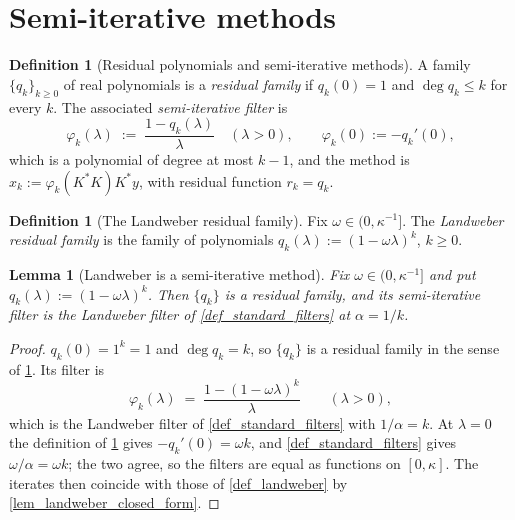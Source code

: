 \documentclass[a4paper]{report}
\theoremstyle{plain}
\newtheorem{lemma}[theorem]{Lemma}
\theoremstyle{definition}
\newtheorem{definition}[theorem]{Definition}
\theoremstyle{remark}
\begin{document}
\section{Semi-iterative methods}

\begin{definition}[Residual polynomials and semi-iterative methods]
  \label{def_residual_polynomial}
  A family $\{q_k\}_{k \ge 0}$ of real polynomials is a \emph{residual family} if
  $q_k(0) = 1$ and $\deg q_k \le k$ for every $k$.  The associated \emph{semi-iterative
  filter} is
  \[
    \varphi_{k}(\lambda) \;:=\; \frac{1-q_k(\lambda)}{\lambda} \quad (\lambda > 0),
    \qquad \varphi_k(0) := -q_k'(0) ,
  \]
  which is a polynomial of degree at most $k-1$, and the method is
  $x_k := \varphi_k(K^{*}K)K^{*}y$, with residual function $r_k = q_k$.
\end{definition}


\begin{definition}[The Landweber residual family]
  \label{def_landweber_residual_poly}
  Fix $\omega \in (0,\kappa^{-1}]$.  The \emph{Landweber residual family} is the family
  of polynomials $q_k(\lambda) := (1-\omega\lambda)^{k}$, $k \ge 0$.
\end{definition}


\begin{lemma}[Landweber is a semi-iterative method]
  \label{lem_landweber_residual_polynomial}
  Fix $\omega \in (0,\kappa^{-1}]$ and put $q_k(\lambda) := (1-\omega\lambda)^{k}$.  Then
  $\{q_k\}$ is a residual family, and its semi-iterative filter is the Landweber filter of
  \cref{def_standard_filters} at $\alpha = 1/k$.
\end{lemma}
\begin{proof}
  $q_k(0) = 1^{k} = 1$ and $\deg q_k = k$, so $\{q_k\}$ is a residual family in the sense
  of \cref{def_residual_polynomial}.  Its filter is
  \[
    \varphi_k(\lambda) \;=\; \frac{1-(1-\omega\lambda)^{k}}{\lambda}
      \qquad (\lambda > 0) ,
  \]
  which is the Landweber filter of \cref{def_standard_filters} with $1/\alpha = k$.  At
  $\lambda = 0$ the definition of \cref{def_residual_polynomial} gives
  $-q_k'(0) = \omega k$, and \cref{def_standard_filters} gives $\omega/\alpha = \omega k$;
  the two agree, so the filters are equal as functions on $[0,\kappa]$.  The iterates then
  coincide with those of \cref{def_landweber} by \cref{lem_landweber_closed_form}.
\end{proof}
\end{document}

